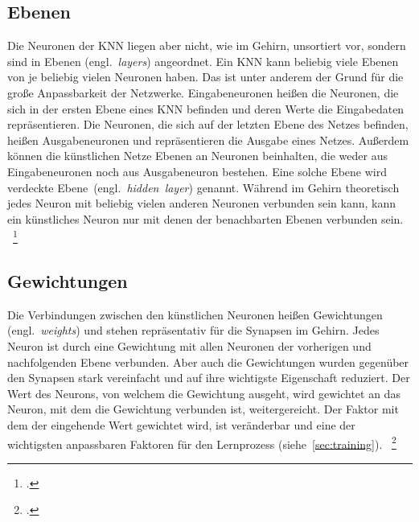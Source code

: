 \subsection{Ebenen}\label{subsec:ebenen}
Die Neuronen der KNN liegen aber nicht, wie im Gehirn, unsortiert vor, sondern sind in Ebenen (engl.~\textit{layers}) angeordnet.
Ein KNN kann beliebig viele Ebenen von je beliebig vielen Neuronen haben.
Das ist unter anderem der Grund für die große Anpassbarkeit der Netzwerke.
Eingabeneuronen heißen die Neuronen, die sich in der ersten Ebene eines KNN befinden und deren Werte die Eingabedaten repräsentieren.
Die Neuronen, die sich auf der letzten Ebene des Netzes befinden, heißen Ausgabeneuronen und repräsentieren die Ausgabe eines Netzes.
Außerdem können die künstlichen Netze Ebenen an Neuronen beinhalten, die weder aus Eingabeneuronen noch aus Ausgabeneuron bestehen.
Eine solche Ebene wird verdeckte Ebene~(engl.~\textit{hidden~layer}) genannt.
Während im Gehirn theoretisch jedes Neuron mit beliebig vielen anderen Neuronen verbunden sein kann, kann ein künstliches Neuron nur mit denen der benachbarten Ebenen verbunden sein.
~\footcite{3b1b-1}

\subsection{Gewichtungen}\label{subsec:gewichtungen}
Die Verbindungen zwischen den künstlichen Neuronen heißen Gewichtungen (engl.~\textit{weights}) und stehen repräsentativ für die Synapsen im Gehirn.
Jedes Neuron ist durch eine Gewichtung mit allen Neuronen der vorherigen und nachfolgenden Ebene verbunden.
Aber auch die Gewichtungen wurden gegenüber den Synapsen stark vereinfacht und auf ihre wichtigste Eigenschaft reduziert.
Der Wert des Neurons, von welchem die Gewichtung ausgeht, wird gewichtet an das Neuron, mit dem die Gewichtung verbunden ist, weitergereicht.
Der Faktor mit dem der eingehende Wert gewichtet wird, ist veränderbar und eine der wichtigsten anpassbaren Faktoren für den Lernprozess (siehe~\autoref{sec:training}).
~\footcite{3b1b-1}


